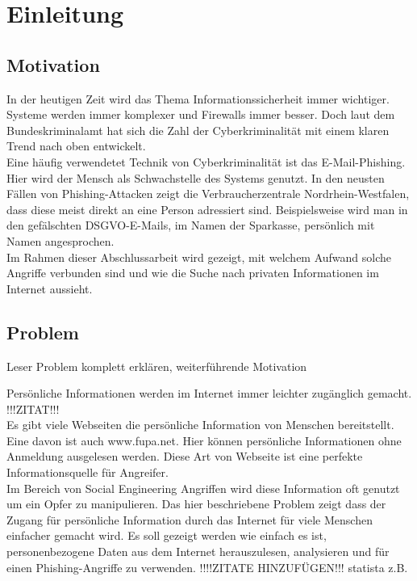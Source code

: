 \chapter{Einleitung}
\label{cha:einleitung}


\section{Motivation}
\label {sec:Motivation}
In der heutigen Zeit wird das Thema Informationssicherheit immer wichtiger. Systeme werden immer komplexer und Firewalls immer besser.
Doch laut dem Bundeskriminalamt hat sich die Zahl der Cyberkriminalität mit einem klaren Trend nach oben entwickelt. \cite{Cyberkriminalitaet}\\
Eine häufig verwendetet Technik von Cyberkriminalität ist das E-Mail-Phishing. Hier wird der Mensch als Schwachstelle des Systems genutzt. In den neusten Fällen von Phishing-Attacken zeigt die Verbraucherzentrale Nordrhein-Westfalen, dass diese meist direkt an eine Person adressiert sind. Beispielsweise wird man in den gefälschten DSGVO-E-Mails, im Namen der Sparkasse, persönlich mit Namen angesprochen. \cite{VerbraucherzentraleNW} \\
Im Rahmen dieser Abschlussarbeit wird gezeigt, mit welchem Aufwand solche Angriffe verbunden sind und wie die Suche nach privaten Informationen im Internet aussieht.

\section{Problem}
Leser Problem komplett erklären, weiterführende Motivation

Persönliche Informationen werden im Internet immer leichter zugänglich gemacht. !!!ZITAT!!!\\
Es gibt viele Webseiten die persönliche Information von Menschen bereitstellt. Eine davon ist auch www.fupa.net. Hier können persönliche Informationen ohne Anmeldung ausgelesen werden. Diese Art von Webseite ist eine perfekte Informationsquelle für Angreifer.\\
Im Bereich von Social Engineering Angriffen wird diese Information oft genutzt um ein Opfer zu manipulieren.
Das hier beschriebene Problem zeigt dass der Zugang für persönliche Information durch das Internet für viele Menschen einfacher gemacht wird. Es soll gezeigt werden wie einfach es ist, personenbezogene Daten aus dem Internet herauszulesen, analysieren und für einen Phishing-Angriffe zu verwenden.
!!!!ZITATE HINZUFÜGEN!!! statista z.B.

